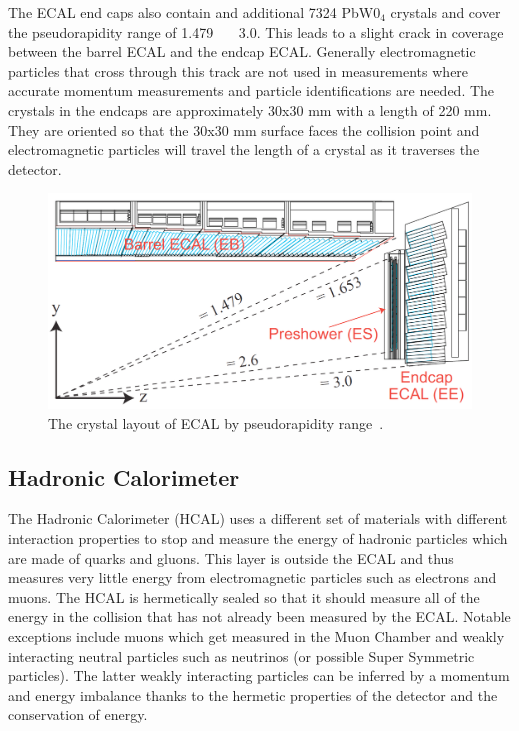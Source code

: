 	The ECAL end caps also contain and additional 7324 PbW0$_4$ crystals and cover the pseudorapidity range of 1.479 \lt \ \abseta \ \lt \ 3.0. This leads to a slight crack in coverage between the barrel ECAL and the endcap ECAL. Generally electromagnetic particles that cross through this track are not used in measurements where accurate momentum measurements and particle identifications are needed. The crystals in the endcaps are approximately 30x30 mm with a length of 220 mm. They are oriented so that the 30x30 mm surface faces the collision point and electromagnetic particles will travel the length of a crystal as it traverses the detector.
	 
	 
						\begin{figure}[h]
\begin{center}
\includegraphics[width=0.8\linewidth]{Figs/ECAL_layout.png}
\caption{\label{fig:ecal}
The crystal layout of ECAL by pseudorapidity range~\cite{tdr1}.
}
\end{center}
\end{figure}
	
	\subsection{Hadronic Calorimeter}
	\label{sec:hadronic_calorimeter}
	The Hadronic Calorimeter (HCAL) uses a different set of materials with different interaction properties to stop and measure the energy of hadronic particles which are made of quarks and gluons. This layer is outside the ECAL and thus measures very little energy from electromagnetic particles such as electrons and muons. The HCAL is hermetically sealed so that it should measure all of the energy in the collision that has not already been measured by the ECAL. Notable exceptions include muons which get measured in the Muon Chamber and weakly interacting neutral particles such as neutrinos (or possible Super Symmetric particles). The latter weakly interacting particles can be inferred by a momentum and energy imbalance thanks to the hermetic properties of the detector and the conservation of energy.\\
	
